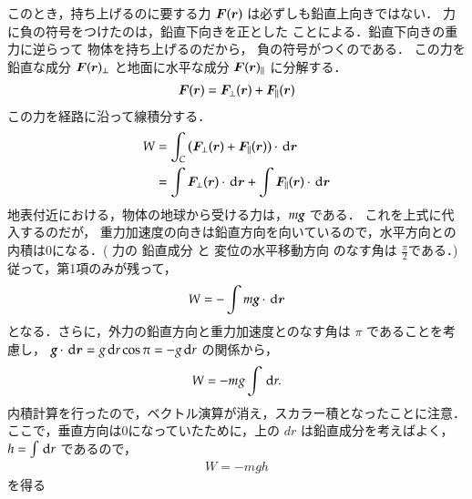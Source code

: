                 このとき，持ち上げるのに要する力 $\boldsymbol{F}(\boldsymbol{r})$ は必ずしも鉛直上向きではない．
                力に負の符号をつけたのは，鉛直下向きを正とした
                ことによる．鉛直下向きの重力に逆らって 物体を持ち上げるのだから，
                負の符号がつくのである．
                この力を鉛直な成分 $\boldsymbol{F}
                (\boldsymbol{r})_{\perp}$
                と地面に水平な成分 $\boldsymbol{F}
                (\boldsymbol{r})_{\parallel}$ に分解する．
                    \begin{align}
                        \boldsymbol{F}(\boldsymbol{r})=\boldsymbol{F}_{\perp}(\boldsymbol{r})
                        +\boldsymbol{F}_{\parallel}(\boldsymbol{r})
                    \end{align}
                この力を経路に沿って線積分する．
                    \begin{align}
                        W &= \int_{C}\left(\boldsymbol{F}_{\perp}(\boldsymbol{r})   + \boldsymbol{F}_{\parallel}(\boldsymbol{r}) \right) \cdot \,\mathrm{d}\boldsymbol{r} \notag \\
                          &= \int\boldsymbol{F}_{\perp}(\boldsymbol{r})\cdot \,\mathrm{d}\boldsymbol{r} + \int\boldsymbol{F}_{\parallel}(\boldsymbol{r}) \cdot \,\mathrm{d}\boldsymbol{r}
                    \end{align}
                地表付近における，物体の地球から受ける力は，$m\textit{\textbf{g}}$ である．
                これを上式に代入するのだが，
                重力加速度の向きは鉛直方向を向いているので，水平方向との内積は0になる．(
                力の 鉛直成分 と 変位の水平移動方向 のなす角は
                $\frac{\pi}{2}$である．)従って，第1項のみが残って，
                    \begin{align}
                        W=-\int m\textit{\textbf{g}}\cdot \,\mathrm{d}\boldsymbol{r}
                    \end{align}
                となる．さらに，外力の鉛直方向と重力加速度とのなす角は $\pi$ であることを考慮し，
                $\textit{\textbf{g}} \cdot \,\mathrm{d}\boldsymbol{r}=g\,\mathrm{d} r \cos \pi=-g\,\mathrm{d} r$ の関係から，
                    \begin{align}
                        W=-mg\int \,\mathrm{d} r.
                    \end{align}
                内積計算を行ったので，ベクトル演算が消え，スカラー積となったことに注意．
                ここで，垂直方向は0になっていたために，上の $dr$ は鉛直成分を考えばよく， $h=\int \,\mathrm{d} r$ であるので，
                    \begin{align}
                        W=-mgh
                    \end{align}
                を得る
